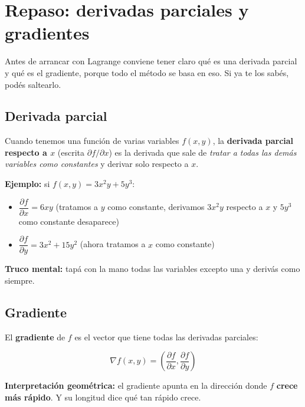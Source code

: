\documentclass[12pt]{article}
\begin{document}
\section{Repaso: derivadas parciales y gradientes}

Antes de arrancar con Lagrange conviene tener claro qué es una derivada parcial y qué es el gradiente, porque todo el método se basa en eso. Si ya te los sabés, podés saltearlo.

\subsection{Derivada parcial}

Cuando tenemos una función de varias variables $f(x, y)$, la \textbf{derivada parcial respecto a $x$} (escrita $\partial f / \partial x$) es la derivada que sale de \textit{tratar a todas las demás variables como constantes} y derivar solo respecto a $x$.

\vspace{0.5em}

\textbf{Ejemplo:} si $f(x, y) = 3x^2 y + 5y^3$:

\begin{itemize}
    \item $\dfrac{\partial f}{\partial x} = 6xy$ (tratamos a $y$ como constante, derivamos $3x^2 y$ respecto a $x$ y $5y^3$ como constante desaparece)
    \item $\dfrac{\partial f}{\partial y} = 3x^2 + 15y^2$ (ahora tratamos a $x$ como constante)
\end{itemize}

\vspace{0.5em}

\textbf{Truco mental:} tapá con la mano todas las variables excepto una y derivás como siempre.

\subsection{Gradiente}

El \textbf{gradiente} de $f$ es el vector que tiene todas las derivadas parciales:

\[
\nabla f(x, y) = \left( \frac{\partial f}{\partial x}, \frac{\partial f}{\partial y} \right)
\]

\vspace{0.5em}

\textbf{Interpretación geométrica:} el gradiente apunta en la dirección donde $f$ \textbf{crece más rápido}. Y su longitud dice qué tan rápido crece.
\end{document}
